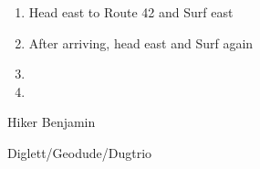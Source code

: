 \begin{paracol}{2}
\begin{enumerate}[resume]
	\item Head east to Route 42 and Surf east
	\item After arriving, head east and Surf again
	\item {}
	\item {}
\end{enumerate}

\switchcolumn*
\vspace{-1cm}
\begin{trainer}{Hiker Benjamin}
	\varwb
	\begin{fightSection}{Diglett/Geodude/Dugtrio}
		\item {} \bite{} 
	\end{fightSection}
	\varwe
\end{trainer}

\end{paracol}
\vspace{3.5mm}
